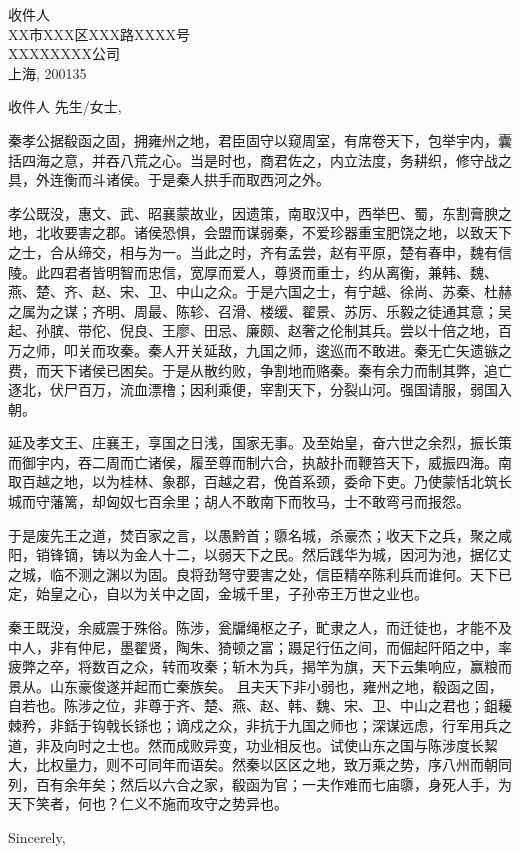 \documentclass[11pt,a4paper]{letter}
\begin{document}
\begin{letter}
{收件人\\
XX市XXX区XXX路XXXX号\\
XXXXXXXX公司\\
上海, 200135}

\opening{收件人 先生/女士,}
\thispagestyle{fancy}

秦孝公据殽函之固，拥雍州之地，君臣固守以窥周室，有席卷天下，包举宇内，囊括四海之意，并吞八荒之心。当是时也，商君佐之，内立法度，务耕织，修守战之具，外连衡而斗诸侯。于是秦人拱手而取西河之外。

孝公既没，惠文、武、昭襄蒙故业，因遗策，南取汉中，西举巴、蜀，东割膏腴之地，北收要害之郡。诸侯恐惧，会盟而谋弱秦，不爱珍器重宝肥饶之地，以致天下之士，合从缔交，相与为一。当此之时，齐有孟尝，赵有平原，楚有春申，魏有信陵。此四君者皆明智而忠信，宽厚而爱人，尊贤而重士，约从离衡，兼韩、魏、燕、楚、齐、赵、宋、卫、中山之众。于是六国之士，有宁越、徐尚、苏秦、杜赫之属为之谋；齐明、周最、陈轸、召滑、楼缓、翟景、苏厉、乐毅之徒通其意；吴起、孙膑、带佗、倪良、王廖、田忌、廉颇、赵奢之伦制其兵。尝以十倍之地，百万之师，叩关而攻秦。秦人开关延敌，九国之师，逡巡而不敢进。秦无亡矢遗镞之费，而天下诸侯已困矣。于是从散约败，争割地而赂秦。秦有余力而制其弊，追亡逐北，伏尸百万，流血漂橹；因利乘便，宰割天下，分裂山河。强国请服，弱国入朝。

延及孝文王、庄襄王，享国之日浅，国家无事。及至始皇，奋六世之余烈，振长策而御宇内，吞二周而亡诸侯，履至尊而制六合，执敲扑而鞭笞天下，威振四海。南取百越之地，以为桂林、象郡，百越之君，俛首系颈，委命下吏。乃使蒙恬北筑长城而守藩篱，却匈奴七百余里；胡人不敢南下而牧马，士不敢弯弓而报怨。

于是废先王之道，焚百家之言，以愚黔首；隳名城，杀豪杰；收天下之兵，聚之咸阳，销锋镝，铸以为金人十二，以弱天下之民。然后践华为城，因河为池，据亿丈之城，临不测之渊以为固。良将劲弩守要害之处，信臣精卒陈利兵而谁何。天下已定，始皇之心，自以为关中之固，金城千里，子孙帝王万世之业也。

秦王既没，余威震于殊俗。陈涉，瓮牖绳枢之子，甿隶之人，而迁徒也，才能不及中人，非有仲尼，墨翟贤，陶朱、猗顿之富；蹑足行伍之间，而倔起阡陌之中，率疲弊之卒，将数百之众，转而攻秦；斩木为兵，揭竿为旗，天下云集响应，赢粮而景从。山东豪俊遂并起而亡秦族矣。
且夫天下非小弱也，雍州之地，殽函之固，自若也。陈涉之位，非尊于齐、楚、燕、赵、韩、魏、宋、卫、中山之君也；鉏耰棘矜，非銛于钩戟长铩也；谪戍之众，非抗于九国之师也；深谋远虑，行军用兵之道，非及向时之士也。然而成败异变，功业相反也。试使山东之国与陈涉度长絜大，比权量力，则不可同年而语矣。然秦以区区之地，致万乘之势，序八州而朝同列，百有余年矣；然后以六合之家，殽函为官；一夫作难而七庙隳，身死人手，为天下笑者，何也？仁义不施而攻守之势异也。


\closing{Sincerely,}
\bigskip


\vfill
\end{letter}
\vfill
\end{document}
